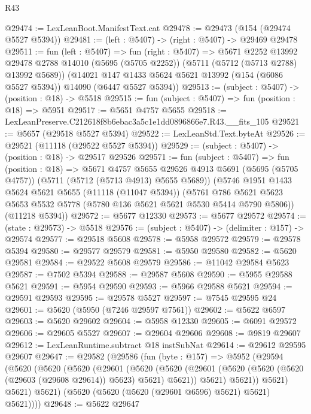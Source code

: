 \begin{lexlean}{R43}
\begin{coremodule}
@29474 := LexLeanBoot.ManifestText.cat
@29478 := @29473 (@154 (@29474 @5527 @5394))
@29481 := (left : @5407) -> (right : @5407) -> @29469 @29478
@29511 := fun (left : @5407) =>
  fun (right : @5407) =>
  @5671
    @2252
    @13992
    @29478
    @2788
    @14010
    (@5695 (@5705 @2252))
    (@5711 (@5712 (@5713 @2788) @13992 @5689))
    (@14021 @147 @1433 @5624 @5621 @13992 (@154 (@6086 @5527 @5394)) @14090 (@6447 @5527 @5394))
@29513 := (subject : @5407) -> (position : @18) -> @5518
@29515 := fun (subject : @5407) => fun (position : @18) => @5951
@29517 := @5651 @4757 @5655
@29518 := LexLeanPreserve.C212618f8b6ebac3a5c1e1dd0896866e7.R43.__fits_105
@29521 := @5657 (@29518 @5527 @5394)
@29522 := LexLeanStd.Text.byteAt
@29526 := @29521 (@11118 (@29522 @5527 @5394))
@29529 := (subject : @5407) -> (position : @18) -> @29517 @29526
@29571 := fun (subject : @5407) =>
  fun (position : @18) =>
  @5671
    @4757
    @5655
    @29526
    @4913
    @5691
    (@5695 (@5705 @4757))
    (@5711 (@5712 (@5713 @4913) @5655 @5689))
    (@5746
      @1951
      @1433
      @5624
      @5621
      @5655
      (@11118 (@11047 @5394))
      (@5761 @786 @5621 @5623 @5653 @5532 @5778 (@5780 @136 @5621 @5621 @5530 @5414 @5790 @5806))
      (@11218 @5394))
@29572 := @5677 @12330
@29573 := @5677 @29572
@29574 := (state : @29573) -> @5518
@29576 := (subject : @5407) -> (delimiter : @157) -> @29574
@29577 := @29518 @5608
@29578 := @5958 @29572
@29579 := @29578 @5394
@29580 := @29577 @29579
@29581 := @5950 @29580
@29582 := @5620 @29581
@29584 := @29522 @5608 @29579
@29586 := @11042 @29584 @5623
@29587 := @7502 @5394
@29588 := @29587 @5608
@29590 := @5955 @29588 @5621
@29591 := @5954 @29590
@29593 := @5966 @29588 @5621
@29594 := @29591 @29593
@29595 := @29578 @5527
@29597 := @7545 @29595 @24
@29601 := @5620 (@5950 (@7246 @29597 @7561))
@29602 := @5622 @6597
@29603 := @5620 @29602
@29604 := @5958 @12330
@29605 := @6091 @29572
@29606 := @29605 @5527
@29607 := @29604 @29606
@29608 := @9819 @29607
@29612 := LexLeanRuntime.subtract @18 instSubNat
@29614 := @29612 @29595 @29607
@29647 := @29582
    (@29586
      (fun (byte : @157) =>
      @5952
        (@29594
          (@5620
            (@5620
              (@5620
                (@29601
                  (@5620
                    (@5620
                      (@29601 (@5620 (@5620 (@5620 (@29603 (@29608 @29614)) @5623) @5621) @5621))
                      @5621)
                    @5621))
                @5621)
              @5621)
            @5621)
          (@5620 (@5620 (@5620 (@29601 @6596) @5621) @5621) @5621))))
@29648 := @5622 @29647

\end{coremodule}
\end{lexlean}
